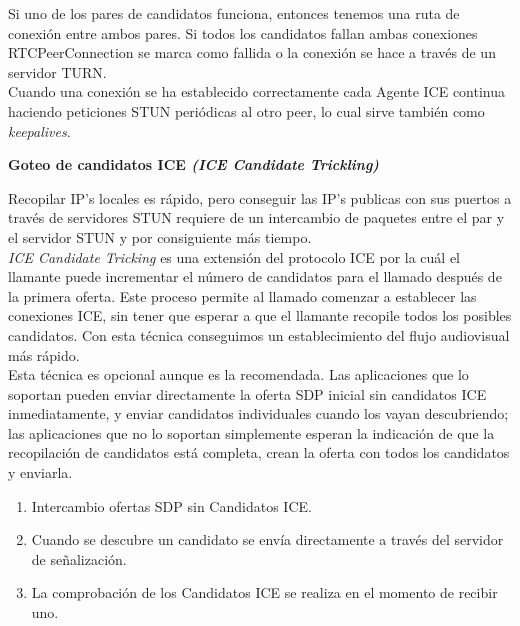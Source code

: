 Si uno de los pares de candidatos funciona, entonces tenemos una ruta de conexión entre ambos pares. Si todos los candidatos fallan ambas conexiones RTCPeerConnection se marca como fallida o la conexión se hace a través de un servidor TURN.\\

Cuando una conexión se ha establecido correctamente cada Agente ICE continua haciendo peticiones STUN periódicas al otro peer, lo cual sirve también como \textit{keepalives}.\\

\begin{normalsize}
\noindent \textbf{Goteo de candidatos ICE \emph{(ICE Candidate Trickling)}}\\
\end{normalsize}

Recopilar IP's locales es rápido, pero conseguir las IP's publicas con sus puertos a través de servidores STUN requiere de un intercambio de paquetes entre el par y el servidor STUN y por consiguiente más tiempo.\\

\emph{ICE Candidate Tricking} es una extensión del protocolo ICE por la cuál el llamante puede incrementar el número de candidatos para el llamado después de la primera oferta. Este proceso permite al llamado comenzar a establecer las conexiones ICE, sin tener que esperar a que el llamante recopile todos los posibles candidatos. Con esta técnica conseguimos un establecimiento del flujo audiovisual más rápido.\\

Esta técnica es opcional aunque es la recomendada. Las aplicaciones que lo soportan pueden enviar directamente la oferta SDP inicial sin candidatos ICE inmediatamente, y enviar candidatos individuales cuando los vayan descubriendo; las aplicaciones que no lo soportan simplemente esperan la indicación de que la recopilación de candidatos está completa, crean la oferta con todos los candidatos y enviarla.\\

\begin{enumerate}
\item Intercambio ofertas SDP sin Candidatos ICE.
\item Cuando se descubre un candidato se envía directamente a través del servidor de señalización.
\item La comprobación de los Candidatos ICE se realiza en el momento de recibir uno.
\end{enumerate}


